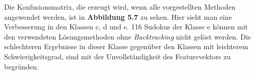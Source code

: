 \noindent Die Konfusionsmatrix, die erzeugt wird, wenn alle vorgestellten Methoden angewendet werden, ist in \textbf{Abbildung 5.7} zu sehen. Hier sieht man eine Verbesserung in den Klassen c, d und e. 116 Sudokus der Klasse e können mit den verwendeten Lösungsmethoden ohne \textit{Backtracking} nicht gelöst werden. Die schlechteren Ergebnisse in dieser Klasse gegenüber den Klassen mit leichterem Schwierigkeitsgrad, sind mit der Unvollständigkeit des Featurevektors zu begründen.
